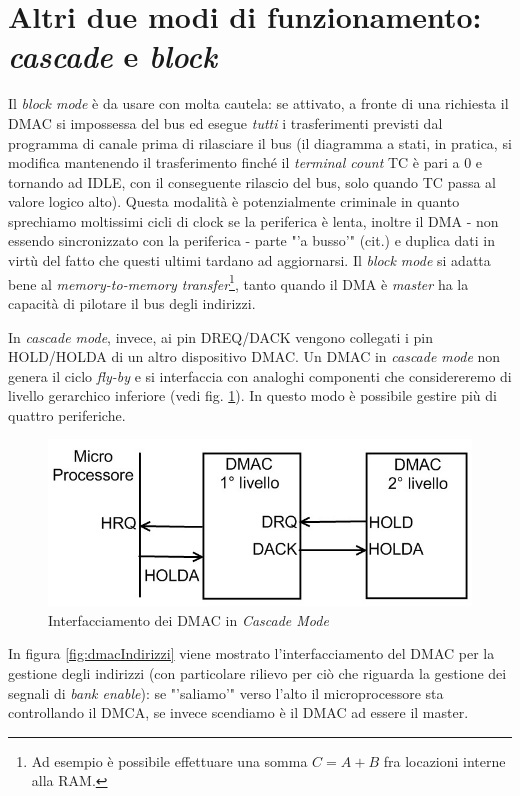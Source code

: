 \section{Altri due modi di funzionamento: \textit{cascade} e \textit{block}}
\label{sec:altriDueModi}

Il \textit{block mode} è da usare con molta cautela: se attivato, a fronte di una richiesta il DMAC si
impossessa del bus ed esegue \emph{tutti} i trasferimenti previsti dal programma di canale prima di rilasciare il
bus (il diagramma a stati, in pratica, si modifica mantenendo il trasferimento finché il \textit{terminal count} TC è pari a 0 e tornando ad IDLE, con il conseguente rilascio del bus, solo quando TC passa al valore logico alto). Questa modalità è potenzialmente criminale in quanto sprechiamo moltissimi cicli di clock se la periferica è lenta, inoltre il DMA - non essendo sincronizzato con la periferica - parte "'a busso'" (cit.) e duplica dati in virtù del fatto che questi ultimi tardano ad aggiornarsi. Il \textit{block mode} si adatta bene al\textit{ memory-to-memory transfer}\footnote{Ad esempio è possibile effettuare una somma $C=A+B$ fra locazioni interne alla RAM.}, tanto quando il DMA è \textit{master} ha la capacità di pilotare il bus degli indirizzi.

In \textit{cascade mode}, invece, ai pin DREQ/DACK vengono collegati i pin HOLD/HOLDA di un altro dispositivo DMAC. Un DMAC in \textit{cascade mode} non genera il ciclo \textit{fly-by} e si interfaccia con analoghi componenti che considereremo di livello gerarchico inferiore (vedi fig. \ref{fig:cascade}). In questo modo è possibile gestire più di quattro periferiche.

\begin{figure}[!h]
\centering
\includegraphics[width=0.55\columnwidth]{img/cascade}
\caption{Interfacciamento dei DMAC in \textit{Cascade Mode}}
\label{fig:cascade}
\end{figure}

In figura \ref{fig:dmacIndirizzi} viene mostrato l'interfacciamento del DMAC per la gestione degli indirizzi (con particolare rilievo per ciò che riguarda la gestione dei segnali di \textit{bank enable}): se "'saliamo'" verso l'alto il microprocessore sta controllando il DMCA, se invece scendiamo è il DMAC ad essere il master.

